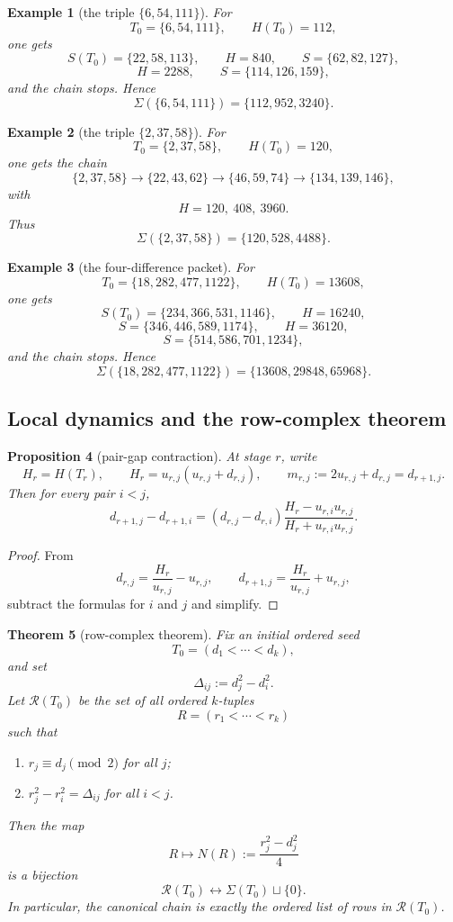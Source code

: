\documentclass[11pt]{article}
\theoremstyle{plainbreak}
\newtheorem{theorem}{Theorem}[section]
\newtheorem{proposition}[theorem]{Proposition}
\theoremstyle{defbreak}
\newtheorem{example}[theorem]{Example}
\begin{document}
\begin{example}[the triple $\{6,54,111\}$]
For
\[
T_0=\{6,54,111\},
\qquad H(T_0)=112,
\]
one gets
\[
S(T_0)=\{22,58,113\},
\qquad H=840,
\qquad S=\{62,82,127\},
\]
\[
H=2288,
\qquad S=\{114,126,159\},
\]
and the chain stops. Hence
\[
\Sigma(\{6,54,111\})=\{112,952,3240\}.
\]
\end{example}

\begin{example}[the triple $\{2,37,58\}$]
For
\[
T_0=\{2,37,58\},
\qquad H(T_0)=120,
\]
one gets the chain
\[
\{2,37,58\}\to \{22,43,62\}\to \{46,59,74\}\to \{134,139,146\},
\]
with
\[
H=120,\ 408,\ 3960.
\]
Thus
\[
\Sigma(\{2,37,58\})=\{120,528,4488\}.
\]
\end{example}

\begin{example}[the four-difference packet]
For
\[
T_0=\{18,282,477,1122\},
\qquad H(T_0)=13608,
\]
one gets
\[
S(T_0)=\{234,366,531,1146\},\qquad H=16240,
\]
\[
S=\{346,446,589,1174\},\qquad H=36120,
\]
\[
S=\{514,586,701,1234\},
\]
and the chain stops. Hence
\[
\Sigma(\{18,282,477,1122\})=\{13608,29848,65968\}.
\]
\end{example}

\subsection{Local dynamics and the row-complex theorem}

\begin{proposition}[pair-gap contraction]
At stage $r$, write
\[
H_r=H(T_r),
\qquad
H_r=u_{r,j}(u_{r,j}+d_{r,j}),
\qquad
m_{r,j}:=2u_{r,j}+d_{r,j}=d_{r+1,j}.
\]
Then for every pair $i<j$,
\[
d_{r+1,j}-d_{r+1,i}
=
(d_{r,j}-d_{r,i})
\frac{H_r-u_{r,i}u_{r,j}}{H_r+u_{r,i}u_{r,j}}.
\]
\end{proposition}

\begin{proof}
From
\[
d_{r,j}=\frac{H_r}{u_{r,j}}-u_{r,j},
\qquad
d_{r+1,j}=\frac{H_r}{u_{r,j}}+u_{r,j},
\]
subtract the formulas for $i$ and $j$ and simplify.
\end{proof}

\begin{theorem}[row-complex theorem]
Fix an initial ordered seed
\[
T_0=(d_1<\cdots<d_k),
\]
and set
\[
\Delta_{ij}:=d_j^2-d_i^2.
\]
Let $\mathcal R(T_0)$ be the set of all ordered $k$-tuples
\[
R=(r_1<\cdots<r_k)
\]
such that
\begin{enumerate}[label=\textup{(\roman*)}]
    \item $r_j\equiv d_j\pmod 2$ for all $j$;
    \item $r_j^2-r_i^2=\Delta_{ij}$ for all $i<j$.
\end{enumerate}
Then the map
\[
R\longmapsto N(R):=\frac{r_j^2-d_j^2}{4}
\]
is a bijection
\[
\mathcal R(T_0)\longleftrightarrow \Sigma(T_0)\sqcup\{0\}.
\]
In particular, the canonical chain is exactly the ordered list of rows in $\mathcal R(T_0)$.
\end{theorem}
\end{document}
